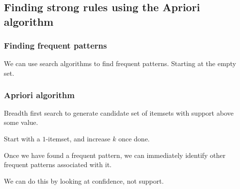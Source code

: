
\subsection{Finding strong rules using the Apriori algorithm}

\subsubsection{Finding frequent patterns}

We can use search algorithms to find frequent patterns. Starting at the empty set.

\subsubsection{Apriori algorithm}

Breadth first search to generate candidate set of itemsets with support above some value.

Start with a \(1\)-itemset, and increase \(k\) once done.

Once we have found a frequent pattern, we can immediately identify other frequent patterns associated with it.

We can do this by looking at confidence, not support.

